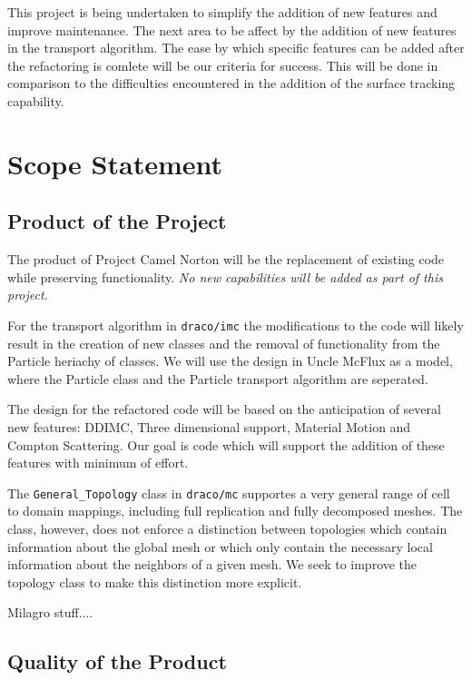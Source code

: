 \documentclass[11pt]{nmemo}
\begin{document}
This project is being undertaken to simplify the addition of new
features and improve maintenance. The next area to be affect by the
addition of new features in the transport algorithm. The ease by which
specific features can be added after the refactoring is comlete will
be our criteria for success. This will be done in comparison to the
difficulties encountered in the addition of the surface tracking
capability.

\newpage
\section*{Scope Statement}


\subsection*{Product of the Project}

The product of Project Camel Norton will be the replacement of
existing code while preserving functionality. {\em No new capabilities
  will be added as part of this project.}

For the transport algorithm in {\tt draco/imc} the modifications to
the code will likely result in the creation of new classes and the
removal of functionality from the Particle heriachy of classes. We
will use the design in Uncle McFlux as a model, where the Particle
class and the Particle transport algorithm are seperated.

The design for the refactored code will be based on the anticipation
of several new features: DDIMC, Three dimensional support, Material
Motion and Compton Scattering. Our goal is code which will support the
addition of these features with minimum of effort.

The {\tt General\_Topology} class in {\tt draco/mc} supportes a very
general range of cell to domain mappings, including full replication
and fully decomposed meshes. The class, however, does not enforce a
distinction between topologies which contain information about the
global mesh or which only contain the necessary local information
about the neighbors of a given mesh. We seek to improve the topology
class to make this distinction more explicit.

Milagro stuff....

\subsection*{Quality of the Product}
\end{document}

